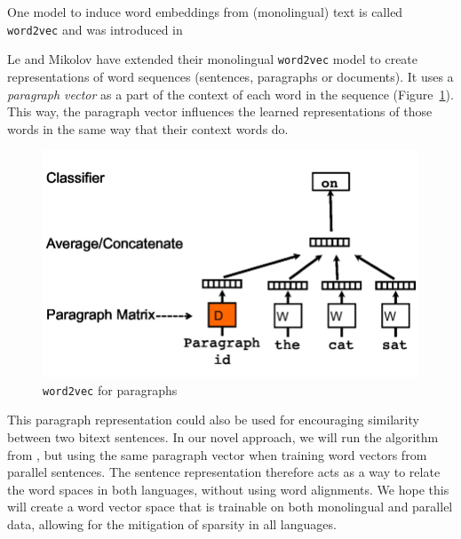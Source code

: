 
One model to induce word embeddings from (monolingual) text is called \texttt{word2vec}  and was introduced in %








Le and Mikolov \cite{Le2014} have extended their monolingual \texttt{word2vec} model to create representations of word sequences (sentences, paragraphs or documents).
It uses a \emph{paragraph vector} as a part of the context of each word in the sequence (Figure~\ref{fig:p2v}). 
This way, the paragraph vector influences the learned representations of those words in the same way that their context words do.

\begin{figure}[here]\center
\includegraphics[width=0.7\linewidth]{figures/le.png}
\caption{\texttt{word2vec} for paragraphs}
\label{fig:p2v}
\end{figure}
This paragraph representation could also be used for encouraging similarity between two bitext sentences.
In our novel approach, we will run the algorithm from \cite{Le2014}, but using the same paragraph vector when training word vectors from parallel sentences.
The sentence representation therefore acts as a way to relate the word spaces in both languages, without using word alignments.
We hope this will create a word vector space that is trainable on both monolingual and parallel data, allowing for the mitigation of sparsity in all languages.

